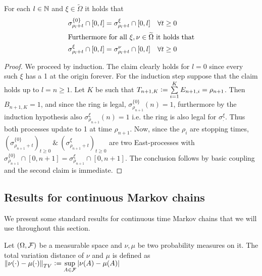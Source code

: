 \begin{proposition}\label{prop:East_linear_coupling}
For each $l \in \N$ and $\xi \in \widetilde{\Omega}$ it holds that 
\begin{align}
\sigma^{\{0\}}_{\rho_l + t} \cap [0, l] &= \sigma^\xi_{\rho_l + t} \cap [0, l] &&\forall t \geq 0 \\
\intertext{Furthermore for all $\xi, \nu \in \widetilde{\Omega}$ it holds that}
\sigma^\xi_{\rho_l + t} \cap [0, l] &= \sigma^\nu_{\rho_l + t} \cap [0, l] &&\forall t \geq 0 
\end{align}
\end{proposition}

\begin{proof}
We proceed by induction. The claim clearly holds for $l=0$ since every such $\xi$ has a 1 at the origin forever. For the induction step suppose that the claim holds up to $l=n \geq 1$. Let $K$ be such that $T_{n+1, K} \defeq \sum\limits^{K}_{i=1} E_{n+1, i} = \rho_{n+1}$. Then $B_{n+1, K}=1$, and since the ring is legal, $\sigma^{\{0\}}_{\rho_{n+1}}(n) = 1$, furthermore by the induction hypothesis also $\sigma^\xi_{\rho_{n+1}}(n) = 1$ i.e. the ring is also legal for $\sigma^\xi_.$. Thus both processes update to 1 at time $\rho_{n+1}$. Now, since the $\rho_i$ are stopping times, $(\sigma^{\{0\}}_{\rho_{n+1}+t})_{t \geq 0}\ \&\ (\sigma^\xi_{\rho_{n+1} + t})_{t \geq 0}$ are two East-processes with $\sigma^{\{0\}}_{\rho_{n+1}} \cap [0, n+1] = \sigma^\xi_{\rho_{n+1}} \cap [0, n+1] $. The conclusion follows by basic coupling and the second claim is immediate. 
\end{proof}

\subsection{Results for continuous Markov chains}
We present some standard results for continuous time Markov chains that we will use throughout this section. 
\begin{definition}
Let $(\Omega, \cal{F})$ be a measurable space and $\nu, \mu$ be two probability measures on it. The total variation distance of $\nu$ and $\mu$ is defined as $\left\Vert \nu(\cdot) - \mu(\cdot) \right\Vert_{TV} \defeq \sup\limits_{A \in \cal{F}} \left| \nu(A) - \mu(A) \right|$
\end{definition}


